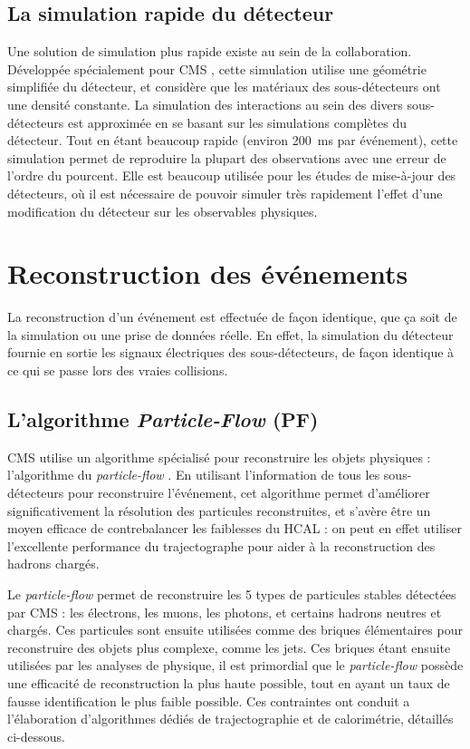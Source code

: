 \subsection{La simulation rapide du détecteur}

Une solution de simulation plus rapide existe au sein de la collaboration. Développée spécialement pour CMS \citep{1742-6596-219-3-032053}, cette simulation utilise une géométrie simplifiée du détecteur, et considère que les matériaux des sous-détecteurs ont une densité constante. La simulation des interactions au sein des divers sous-détecteurs est approximée en se basant sur les simulations complètes du détecteur. Tout en étant beaucoup rapide (environ \SI{200}{\ms} par événement), cette simulation permet de reproduire la plupart des observations avec une erreur de l'ordre du pourcent.  Elle est beaucoup utilisée pour les études de mise-à-jour des détecteurs, où il est nécessaire de pouvoir simuler très rapidement l'effet d'une modification du détecteur sur les observables physiques.

\section{Reconstruction des événements}

La reconstruction d'un événement est effectuée de façon identique, que ça soit de la simulation ou une prise de données réelle. En effet, la simulation du détecteur fournie en sortie les signaux électriques des sous-détecteurs, de façon identique à ce qui se passe lors des vraies collisions.

\subsection{L'algorithme \emph{Particle-Flow} (PF)}

CMS utilise un algorithme spécialisé pour reconstruire les objets physiques : l'algorithme du \emph{particle-flow} \citep{pf,cms_pf_2,cms_pf_jets,cms_pf_leptons}. En utilisant l'information de tous les sous-détecteurs pour reconstruire l'événement, cet algorithme permet d'améliorer significativement la résolution des particules reconstruites, et s'avère être un moyen efficace de contrebalancer les faiblesses du HCAL : on peut en effet utiliser l'excellente performance du trajectographe pour aider à la reconstruction des hadrons chargés.

Le \emph{particle-flow} permet de reconstruire les 5 types de particules stables détectées par CMS : les électrons, les muons, les photons, et certains hadrons neutres et chargés. Ces particules sont ensuite utilisées comme des briques élémentaires pour reconstruire des objets plus complexe, comme les jets. Ces briques étant ensuite utilisées par les analyses de physique, il est primordial que le \emph{particle-flow} possède une efficacité de reconstruction la plus haute possible, tout en ayant un taux de fausse identification le plus faible possible. Ces contraintes ont conduit a l'élaboration d'algorithmes dédiés de trajectographie et de calorimétrie, détaillés ci-dessous.

